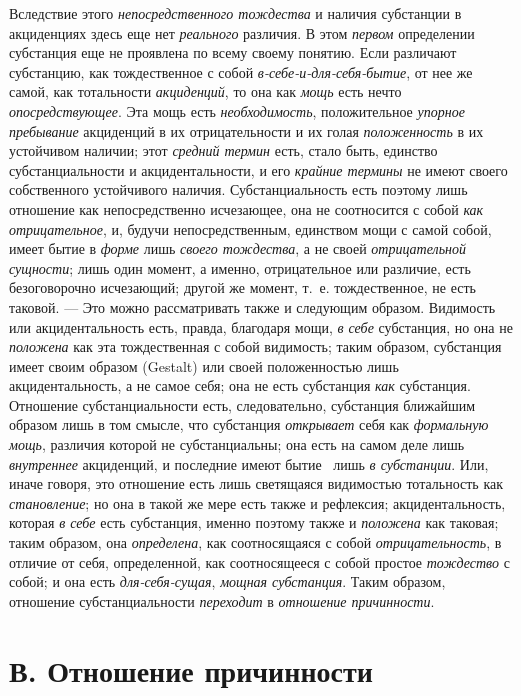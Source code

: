 Вследствие этого {\em непосредственного тождества} и
наличия субстанции в акциденциях здесь еще нет
{\em реального} различия. В этом
{\em первом} определении субстанция еще не проявлена по
всему своему понятию. Если различают субстанцию, как тождественное с собой
{\em в-себе-и-для-себя-бытие}, от нее же самой, как
тотальности {\em акциденций}, то она как
{\em мощь} есть нечто
{\em опосредствующее}. Эта мощь есть
{\em необходимость}, положительное
{\em упорное пребывание} акциденций в их
отрицательности и их голая {\em положенность} в их
устойчивом наличии; этот {\em средний термин} есть,
стало быть, единство субстанциальности и акцидентальности, и его
{\em крайние термины} не имеют своего собственного
устойчивого наличия. Субстанциальность есть поэтому лишь отношение как
непосредственно исчезающее, она не соотносится с собой
{\em как отрицательное}, и, будучи непосредственным,
единством мощи с самой собой, имеет бытие в {\em форме}
лишь {\em своего тождества}, а не своей
{\em отрицательной сущности}; лишь один момент, а
именно, отрицательное или различие, есть безоговорочно исчезающий; другой
же момент, т.~е. тождественное, не есть таковой. — Это можно рассматривать
также и следующим образом. Видимость или акцидентальность есть, правда,
благодаря мощи, {\em в себе} субстанция, но она не
{\em положена} как эта тождественная с собой видимость;
таким образом, субстанция имеет своим образом (Gestalt) или своей
положенностью лишь акцидентальность, а не самое себя; она не есть
субстанция {\em как} субстанция. Отношение
субстанциальности есть, следовательно, субстанция ближайшим образом лишь в
том смысле, что субстанция {\em открывает} себя как
{\em формальную мощь}, различия которой не
субстанциальны; она есть на самом деле лишь
{\em внутреннее} акциденций, и последние имеют бытие
\ лишь {\em в субстанции}. Или, иначе говоря, это
отношение есть лишь светящаяся видимостью тотальность как
{\em становление}; но она в такой же мере есть также и
рефлексия; акцидентальность, которая {\em в себе} есть
субстанция, именно поэтому также и {\em положена} как
таковая; таким образом, она {\em определена}, как
соотносящаяся с собой {\em отрицательность}, в отличие
от себя, определенной, как соотносящееся с собой простое
{\em тождество} с собой; и она есть
{\em для-себя-сущая}, {\em мощная
субстанция}. Таким образом, отношение субстанциальности
{\em переходит} в {\em отношение
причинности}.


\section[В. Отношение причинности]{В. Отношение причинности}

